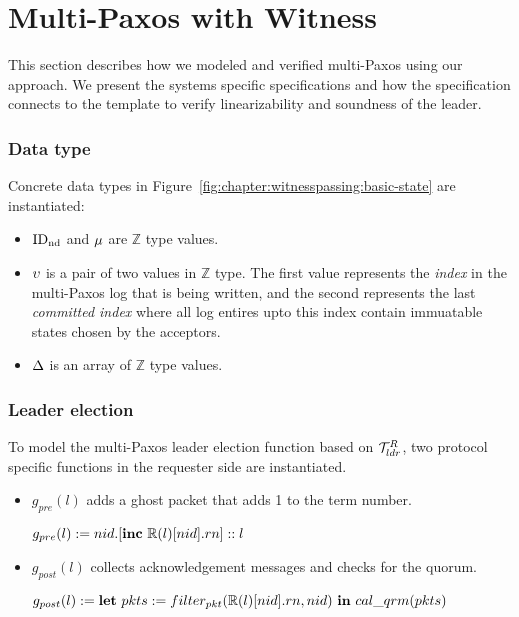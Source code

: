 
\section{Multi-Paxos with Witness}
\label{chapter:witnesspassing:sec:multipaxos-with-witness}


This section describes how we modeled and verified multi-Paxos using 
our approach. We present the systems specific specifications and how the
specification connects to the template to verify linearizability and soundness
of the leader. 

\subsubsection{Data type}

Concrete data types in Figure~\ref{fig:chapter:witnesspassing:basic-state} are instantiated:
\begin{itemize}
\item $\mathrm{ID_{nd}}$ and $\mu$ are $\mathbb{Z}$ type values.
\item $\upsilon$ is a pair of two values in $\mathbb{Z}$ type. The first value represents 
the \textit{index} in the multi-Paxos log that is being written, and the 
second represents the last \textit{committed index} where all log entires upto this
index contain immuatable states chosen by the acceptors.
\item $\Delta$ is an array of $\mathbb{Z}$ type values.
\end{itemize}

\subsubsection{Leader election}
To model the multi-Paxos leader election function based on $\mathcal{T}^{R}_{ldr}$,
two protocol specific functions in the requester side are instantiated.
\begin{itemize}
\item $g_{pre} (l)$ adds a ghost packet that adds 1 to the term number.
\begin{center}
$g_{pre} (l) := nid.[\mbox{\textbf{inc}} \ \replay(l)[nid].rn]::l$
\end{center}
\item $g_{post} (l)$ collects acknowledgement messages and checks for the
	quorum.
	\begin{center}
$g_{post} (l) := \mbox{\textbf{let}}\ pkts := filter_{pkt}(\replay(l)[nid].rn, nid)\ \mbox{\textbf{in}} \ cal\_qrm(pkts)$
\end{center}
\end{itemize}

